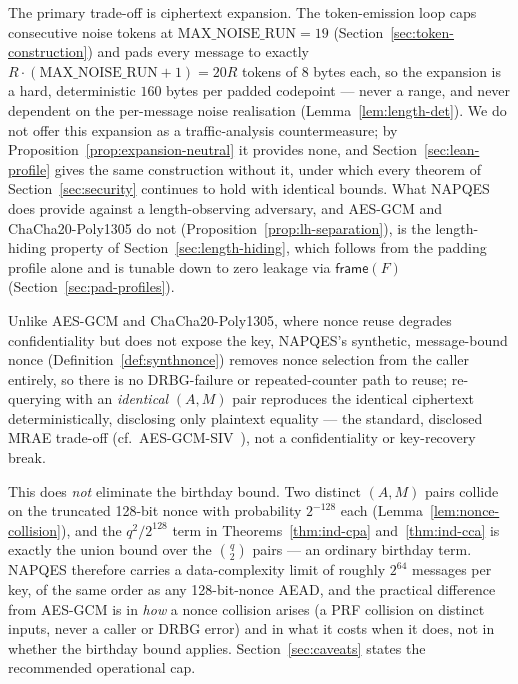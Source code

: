 \documentclass[11pt,a4paper]{article}
\begin{document}
The primary trade-off is ciphertext expansion. The token-emission loop caps
consecutive noise tokens at $\mathrm{MAX\_NOISE\_RUN}=19$
(Section~\ref{sec:token-construction}) and pads every message to exactly
$R\cdot(\mathrm{MAX\_NOISE\_RUN}+1)=20R$ tokens of $8$ bytes each, so the
expansion is a hard, deterministic $160$ bytes per padded codepoint — never
a range, and never dependent on the per-message noise realisation
(Lemma~\ref{lem:length-det}). We do not offer this expansion as a
traffic-analysis countermeasure; by
Proposition~\ref{prop:expansion-neutral} it provides none, and
Section~\ref{sec:lean-profile} gives the same construction without it,
under which every theorem of Section~\ref{sec:security} continues to hold
with identical bounds. What NAPQES does provide against a length-observing
adversary, and AES-GCM and ChaCha20-Poly1305 do not
(Proposition~\ref{prop:lh-separation}), is the length-hiding property of
Section~\ref{sec:length-hiding}, which follows from the padding profile
alone and is tunable down to zero leakage via $\mathsf{frame}(F)$
(Section~\ref{sec:pad-profiles}).

Unlike AES-GCM and ChaCha20-Poly1305, where nonce reuse degrades
confidentiality but does not expose the key, NAPQES's synthetic,
message-bound nonce (Definition~\ref{def:synthnonce}) removes nonce
selection from the caller entirely, so there is no DRBG-failure or
repeated-counter path to reuse; re-querying with an \emph{identical}
$(A,M)$ pair reproduces the identical ciphertext deterministically,
disclosing only plaintext equality — the standard, disclosed MRAE
trade-off (cf.\ AES-GCM-SIV~\cite{rfc8452}), not a confidentiality or
key-recovery break.

This does \emph{not} eliminate the birthday bound. Two distinct $(A,M)$
pairs collide on the truncated 128-bit nonce with probability $2^{-128}$
each (Lemma~\ref{lem:nonce-collision}), and the $q^2/2^{128}$ term in
Theorems~\ref{thm:ind-cpa} and~\ref{thm:ind-cca} is exactly the union bound
over the $\binom{q}{2}$ pairs — an ordinary birthday term. NAPQES therefore
carries a data-complexity limit of roughly $2^{64}$ messages per key, of
the same order as any 128-bit-nonce AEAD, and the practical difference from
AES-GCM is in \emph{how} a nonce collision arises (a PRF collision on
distinct inputs, never a caller or DRBG error) and in what it costs when it
does, not in whether the birthday bound applies. Section~\ref{sec:caveats}
states the recommended operational cap.

\end{document}
